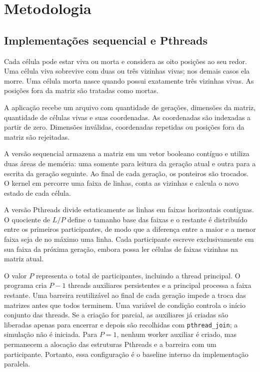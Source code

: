 \documentclass[12pt,a4paper]{article}
\begin{document}
\section{Metodologia}

\subsection{Implementações sequencial e Pthreads}

Cada célula pode estar viva ou morta e considera as oito posições ao seu redor.
Uma célula viva sobrevive com duas ou três vizinhas vivas; nos demais casos ela
morre. Uma célula morta nasce quando possui exatamente três vizinhas vivas. As
posições fora da matriz são tratadas como mortas.

A aplicação recebe um arquivo com quantidade de gerações, dimensões da matriz,
quantidade de células vivas e suas coordenadas. As coordenadas são indexadas a
partir de zero. Dimensões inválidas, coordenadas repetidas ou posições fora da
matriz são rejeitadas.

A versão sequencial armazena a matriz em um vetor booleano contíguo e utiliza
duas áreas de memória: uma somente para leitura da geração atual e outra para a
escrita da geração seguinte. Ao final de cada geração, os ponteiros são
trocados. O kernel em  percorre uma faixa de linhas,
conta as vizinhas e calcula o novo estado de cada célula.

A versão Pthreads divide estaticamente as linhas em faixas horizontais
contíguas. O quociente de $L/P$ define o tamanho base das faixas e o restante é
distribuído entre os primeiros participantes, de modo que a diferença entre a
maior e a menor faixa seja de no máximo uma linha. Cada participante escreve
exclusivamente em sua faixa da próxima geração, embora possa ler células de
faixas vizinhas na matriz atual.

O valor $P$ representa o total de participantes, incluindo a thread principal.
O programa cria $P-1$ threads auxiliares persistentes e a principal processa a
faixa restante. Uma barreira reutilizável ao final de cada geração impede a
troca das matrizes antes que todos terminem. Uma variável de condição controla
o início conjunto das threads. Se a criação for parcial, as auxiliares já
criadas são liberadas apenas para encerrar e depois são recolhidas com
\texttt{pthread\_join}; a simulação não é iniciada. Para $P=1$, nenhum worker
auxiliar é criado, mas permanecem a alocação das estruturas Pthreads e a
barreira com um participante. Portanto, essa configuração é o baseline interno
da implementação paralela.
\end{document}
